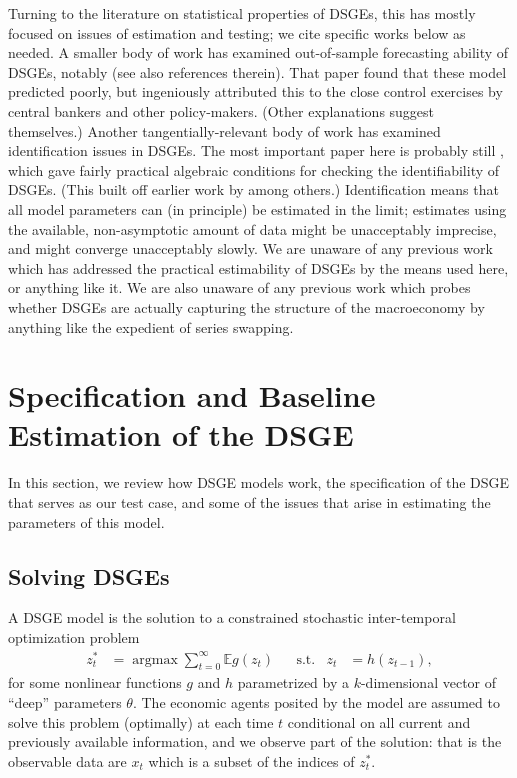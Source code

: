 \documentclass[11pt]{article}
\newcommand{\E}{\mathbb{E}}
\DeclareMathOperator*{\argmax}{argmax}
\begin{document}
Turning to the literature on statistical properties of DSGEs, this has
mostly focused on issues of estimation and testing; we cite specific
works below as needed. A smaller body of work has examined out-of-sample
forecasting ability of DSGEs, notably \citet{Edge-Gurkaynak-on-dsges}
(see also references therein). That paper found that these model
predicted poorly, but ingeniously attributed this to the close control
exercises by central bankers and other policy-makers. (Other
explanations suggest themselves.) Another tangentially-relevant body of
work has examined identification issues in DSGEs. The most important
paper here is probably still
\citet{Komunjer-Ng-identification-of-DSGEs}, which gave fairly practical
algebraic conditions for checking the identifiability of DSGEs. (This
built off earlier work by \citealt{Iskrev2009} among others.)
Identification means that all model parameters can (in principle) be
estimated in the limit; estimates using the available, non-asymptotic
amount of data might be unacceptably imprecise, and might converge
unacceptably slowly. We are unaware of any previous work which has
addressed the practical estimability of DSGEs by the means used here, or
anything like it. We are also unaware of any previous work which probes
whether DSGEs are actually capturing the structure of the macroeconomy
by anything like the expedient of series swapping.

\clearpage

\hypertarget{specification-and-baseline-estimation-of-the-dsge}{%
\section{Specification and Baseline Estimation of the
DSGE}\label{specification-and-baseline-estimation-of-the-dsge}}

In this section, we review how DSGE models work, the specification of
the \citet{SmetsWouters2007} DSGE that serves as our test case, and some
of the issues that arise in estimating the parameters of this model.

\hypertarget{sec:solveDSGEs}{%
\subsection{Solving DSGEs}\label{sec:solveDSGEs}}

A DSGE model is the solution to a constrained stochastic inter-temporal
optimization problem \begin{align}
  z_t^* &=\argmax \sum_{t=0}^\infty \E g(z_t) &&\mbox{s.t.}&z_t&=h(z_{t-1}),
\end{align} for some nonlinear functions \(g\) and \(h\) parametrized by
a \(k\)-dimensional vector of ``deep'' parameters \(\theta\). The
economic agents posited by the model are assumed to solve this problem
(optimally) at each time \(t\) conditional on all current and previously
available information, and we observe part of the solution: that is the
observable data are \(x_t\) which is a subset of the indices of
\(z_t^*\).
\end{document}
